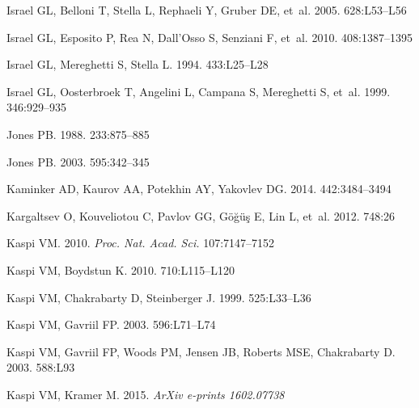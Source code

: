 \documentclass[letterpaper]{ar-1col}
\begin{document}
\begin{thebibliography}{}
{Israel} GL, {Belloni} T, {Stella} L, {Rephaeli} Y, {Gruber} DE, et~al.
  2005{}.
\textit{\apjl} 628:L53--L56

{Israel} GL, {Esposito} P, {Rea} N, {Dall'Osso} S, {Senziani} F, et~al. 2010.
\textit{\mnras} 408:1387--1395

{Israel} GL, {Mereghetti} S, {Stella} L. 1994.
\textit{\apj} 433:L25--L28

{Israel} GL, {Oosterbroek} T, {Angelini} L, {Campana} S, {Mereghetti} S, et~al.
  1999.
\textit{\aap} 346:929--935

Jones PB. 1988.
\textit{\mnras} 233:875--885

{Jones} PB. 2003.
\textit{\apj} 595:342--345

{Kaminker} AD, {Kaurov} AA, {Potekhin} AY, {Yakovlev} DG. 2014.
\textit{\mnras} 442:3484--3494

{Kargaltsev} O, {Kouveliotou} C, {Pavlov} GG, {G{\"o}{\u g}{\"u}{\c s}} E,
  {Lin} L, et~al. 2012.
\textit{\apj} 748:26

{Kaspi} VM. 2010.
\textit{Proc. Nat. Acad. Sci.} 107:7147--7152

{Kaspi} VM, {Boydstun} K. 2010.
\textit{\apjl} 710:L115--L120

Kaspi VM, Chakrabarty D, Steinberger J. 1999.
\textit{\apj} 525:L33--L36

Kaspi VM, Gavriil FP. 2003.
\textit{\apj} 596:L71--L74

Kaspi VM, Gavriil FP, Woods PM, Jensen JB, Roberts MSE, Chakrabarty D. 2003.
\textit{\apj} 588:L93

{Kaspi} VM, {Kramer} M. 2015.
\textit{ArXiv e-prints 1602.07738}


\end{thebibliography}
\end{document}
